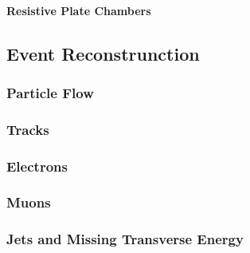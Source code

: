 \paragraph{Resistive Plate Chambers}

\subsection{Event Reconstrunction}
\subsubsection{Particle Flow}
\subsubsection{Tracks}
\subsubsection{Electrons}
\subsubsection{Muons}
\subsubsection{Jets and Missing Transverse Energy}
